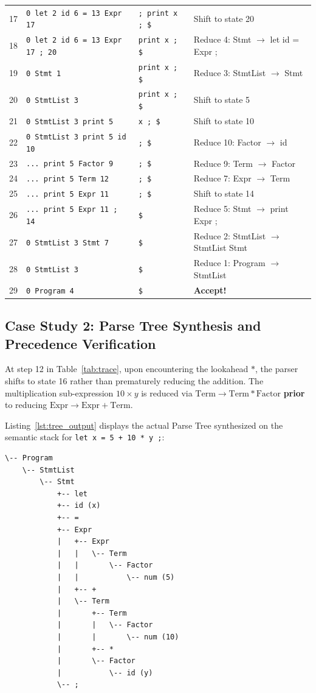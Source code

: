 \documentclass[11pt,a4paper]{article}
\begin{document}
\begin{table}[h]
\begin{tabular}{rlll}
17 & \texttt{0 let 2 id 6 = 13 Expr 17} & \texttt{; print x ; \$} & Shift to state 20 \\
18 & \texttt{0 let 2 id 6 = 13 Expr 17 ; 20} & \texttt{print x ; \$} & Reduce 4: Stmt $\to$ let id = Expr ; \\
19 & \texttt{0 Stmt 1} & \texttt{print x ; \$} & Reduce 3: StmtList $\to$ Stmt \\
20 & \texttt{0 StmtList 3} & \texttt{print x ; \$} & Shift to state 5 \\
21 & \texttt{0 StmtList 3 print 5} & \texttt{x ; \$} & Shift to state 10 \\
22 & \texttt{0 StmtList 3 print 5 id 10} & \texttt{; \$} & Reduce 10: Factor $\to$ id \\
23 & \texttt{... print 5 Factor 9} & \texttt{; \$} & Reduce 9: Term $\to$ Factor \\
24 & \texttt{... print 5 Term 12} & \texttt{; \$} & Reduce 7: Expr $\to$ Term \\
25 & \texttt{... print 5 Expr 11} & \texttt{; \$} & Shift to state 14 \\
26 & \texttt{... print 5 Expr 11 ; 14} & \texttt{\$} & Reduce 5: Stmt $\to$ print Expr ; \\
27 & \texttt{0 StmtList 3 Stmt 7} & \texttt{\$} & Reduce 2: StmtList $\to$ StmtList Stmt \\
28 & \texttt{0 StmtList 3} & \texttt{\$} & Reduce 1: Program $\to$ StmtList \\
29 & \texttt{0 Program 4} & \texttt{\$} & \textbf{Accept!} \\
\bottomrule
\end{tabular}
\end{table}

\subsection{Case Study 2: Parse Tree Synthesis and Precedence Verification}
At step 12 in Table~\ref{tab:trace}, upon encountering the lookahead $*$, the parser shifts to state 16 rather than prematurely reducing the addition. The multiplication sub-expression $10 \times y$ is reduced via $\text{Term} \to \text{Term} * \text{Factor}$ \textbf{prior} to reducing $\text{Expr} \to \text{Expr} + \text{Term}$.

Listing~\ref{lst:tree_output} displays the actual Parse Tree synthesized on the semantic stack for \texttt{let x = 5 + 10 * y ;}:

\begin{lstlisting}[caption={Synthesized Parse Tree Displaying Structural Precedence}, label={lst:tree_output}]
\-- Program
    \-- StmtList
        \-- Stmt
            +-- let
            +-- id (x)
            +-- =
            +-- Expr
            |   +-- Expr
            |   |   \-- Term
            |   |       \-- Factor
            |   |           \-- num (5)
            |   +-- +
            |   \-- Term
            |       +-- Term
            |       |   \-- Factor
            |       |       \-- num (10)
            |       +-- *
            |       \-- Factor
            |           \-- id (y)
            \-- ;
\end{lstlisting}
\end{document}
